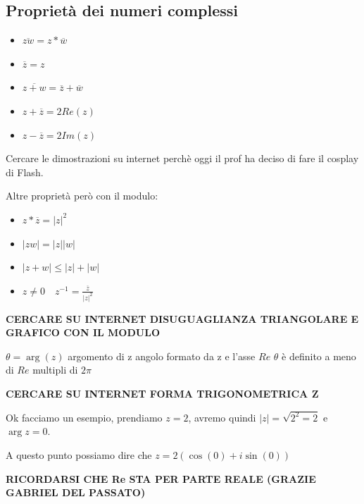 \documentclass{article}
\begin{document}
\subsection{Proprietà dei numeri complessi}

\begin{itemize}
        \item $\overline{zw} = z * \overline{w}$ \\
        \item $\overline{z} = z$ \\
        \item $\overline{z+w} = \overline{z} + \overline{w}$ \\
        \item $z+\overline{z}=2Re(z)$ \\
        \item $z - \overline{z}=2Im(z)$ \\
\end{itemize}
Cercare le dimostrazioni su internet perchè oggi il prof ha deciso di fare il cosplay di Flash.

Altre proprietà però con il modulo:
\begin{itemize}
        \item $z * \overline{z} =   |z|^{2}$ \\
        \item $|zw| = |z| |w|$ \\
        \item $|z+w| \le |z| + |w|$ \\
        \item $z \not = 0 \quad z^{-1} = \frac{\overline{z}}{|z|^{2}} $ \\
\end{itemize}

\textbf{CERCARE SU INTERNET DISUGUAGLIANZA TRIANGOLARE E GRAFICO CON IL MODULO} \newline

$\theta = \arg(z)$
argomento di z angolo formato da z e l'asse $Re$ $\theta$ è definito a meno di $Re$ multipli di $2\pi$

\textbf{CERCARE SU INTERNET FORMA TRIGONOMETRICA Z} \newline

Ok facciamo un esempio, prendiamo $z = 2$, avremo quindi $|z| = \sqrt{2^2 = 2}$ e $\arg{z} = 0$.\par
A questo punto possiamo dire che $z = 2(\cos(0) + i\sin(0))$ \newline

\textbf{RICORDARSI CHE Re STA PER PARTE REALE (GRAZIE GABRIEL DEL PASSATO)} \newline
\end{document}
